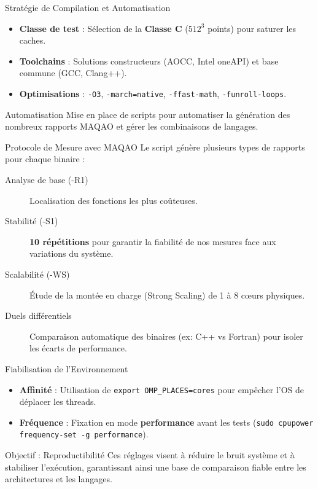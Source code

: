 \begin{frame}{Stratégie de Compilation et Automatisation}
    \begin{itemize}
        \item \textbf{Classe de test} : Sélection de la \textbf{Classe C} ($512^3$ points) pour saturer les caches.
        \item \textbf{Toolchains} : Solutions constructeurs (AOCC, Intel oneAPI) et base commune (GCC, Clang++).
        \item \textbf{Optimisations} : \texttt{-O3}, \texttt{-march=native}, \texttt{-ffast-math}, \texttt{-funroll-loops}.
    \end{itemize}
    \begin{block}{Automatisation}
        Mise en place de scripts pour automatiser la génération des nombreux rapports MAQAO et gérer les combinaisons de langages.
    \end{block}
\end{frame}

\begin{frame}{Protocole de Mesure avec MAQAO}
     Le script génère plusieurs types de rapports pour chaque binaire :
    \begin{description}
        \item[Analyse de base (-R1)] Localisation des fonctions les plus coûteuses.
        \item[Stabilité (-S1)] \textbf{10 répétitions} pour garantir la fiabilité de nos mesures face aux variations du système.
        \item[Scalabilité (-WS)] Étude de la montée en charge (Strong Scaling) de 1 à 8 cœurs physiques.
        \item[Duels différentiels] Comparaison automatique des binaires (ex: C++ vs Fortran) pour isoler les écarts de performance.
    \end{description}
\end{frame}

\begin{frame}{Fiabilisation de l'Environnement}
    \begin{itemize}
        \item \textbf{Affinité} : Utilisation de \texttt{export OMP\_PLACES=cores} pour empêcher l'OS de déplacer les threads.
        \item \textbf{Fréquence} : Fixation en mode \textbf{performance} avant les tests (\texttt{sudo cpupower frequency-set -g performance}).
    \end{itemize}
    
    \begin{block}{Objectif : Reproductibilité}
        Ces réglages visent à réduire le bruit système et à stabiliser l'exécution, garantissant ainsi une base de comparaison fiable entre les architectures et les langages.
    \end{block}
\end{frame}